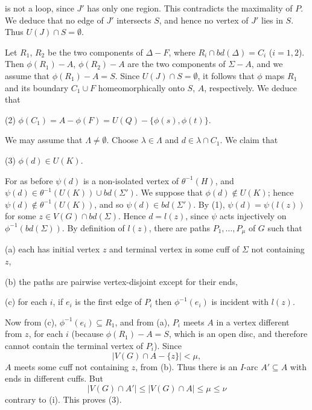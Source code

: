 \noindent is not a loop, since $J'$ has only one region. This contradicts the maximality of $P$. We deduce that no edge of $J'$ intersects $S$, and hence no vertex of $J'$ lies in $S$. Thus $U(J) \cap S = \emptyset$.

Let $R_1$, $R_2$ be the two components of $\Delta - F$, where $R_i \cap bd(\Delta) = C_i$ ($i = 1, 2$). Then $\phi(R_1) - A$, $\phi(R_2) - A$ are the two components of $\Sigma - A$, and we assume that $\phi(R_1) - A = S$. Since $U(J) \cap S = \emptyset$, it follows that $\phi$ maps $R_1$ and its boundary $C_1 \cup F$ homeomorphically onto $S$, $A$, respectively. We deduce that

\hspace*{12pt}(2) $\phi(C_1) = A - \phi(F) = U(Q) - \{\phi(s), \phi(t)\}$.

We may assume that $\Lambda \ne \emptyset$. Choose $\lambda \in \Lambda$ and $d \in \lambda \cap C_1$. We claim that

\hspace*{12pt}(3) $\phi(d) \in U(K)$.

For as before $\psi(d)$ is a non-isolated vertex of $\theta^{-1}(H)$, and $\psi(d) \in \theta^{-1}(U(K)) \cup bd(\Sigma')$. We suppose that $\phi(d) \notin U(K)$; hence $\psi(d) \notin \theta^{-1}(U(K))$, and so $\psi(d) \in bd(\Sigma')$. By (1), $\psi(d) = \psi(l(z))$ for some $z \in V(G) \cap bd(\Sigma)$. Hence $d = l(z)$, since $\psi$ acts injectively on $\phi^{-1}(bd(\Sigma))$. By definition of $l(z)$, there are paths $P_1, \dots, P_\mu$ of $G$ such that

\hspace*{12pt}(a) each has initial vertex $z$ and terminal vertex in some cuff of $\Sigma$ not containing $z$,

\hspace*{12pt}(b) the paths are pairwise vertex-disjoint except for their ends,

\hspace*{12pt}(c) for each $i$, if $e_i$ is the first edge of $P_i$ then $\phi^{-1}(e_i)$ is incident with $l(z)$.

Now from (c), $\phi^{-1}(e_i) \subseteq R_1$, and from (a), $P_i$ meets $A$ in a vertex different from $z$, for each $i$ (because $\phi(R_1) - A = S$, which is an open disc, and therefore cannot contain the terminal vertex of $P_i$). Since
\begin{equation*}
|V(G) \cap A - \{z\}| < \mu,
\end{equation*}
$A$ meets some cuff not containing $z$, from (b). Thus there is an $I$-arc $A' \subseteq A$ with ends in different cuffs. But
\begin{equation*}
|V(G) \cap A'| \le |V(G) \cap A| \le \mu \le \nu
\end{equation*}
contrary to (i). This proves (3).

